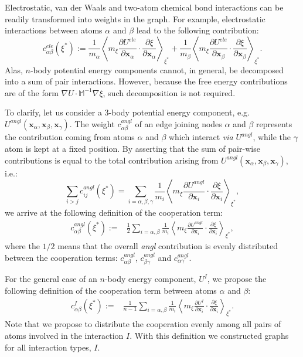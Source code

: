 Electrostatic, van der Waals and two-atom chemical bond interactions can be readily transformed into weights in the graph.
For example, electrostatic interactions between atoms $\alpha$ and $\beta$ lead to the following contribution:
\begin{equation}
c_{\alpha\beta}^{ele}(\xi^*):= \frac{1}{m_\alpha} \left\langle m_\xi \frac{\partial U^{ele}}{\partial \mathbf{x}_\alpha}\cdot\frac{\partial\xi}{\partial\mathbf{x}_\alpha} \right\rangle_{\xi^*}  + \frac{1}{m_\beta} \left\langle m_\xi \frac{\partial U^{ele}}{\partial \mathbf{x}_\beta}\cdot\frac{\partial\xi}{\partial\mathbf{x}_\beta} \right \rangle_{\xi^*} .
\end{equation}
Alas, $n$-body potential energy components cannot, in general, be decomposed into a sum of pair interactions.
However, because the free energy contributions are of the form $\nabla U\cdot\mathbb{M}^{-1}\nabla\xi$, such decomposition is not required.

To clarify, let us consider a 3-body potential energy component, e.g. $U^{angl}(\mathbf{x}_\alpha,\mathbf{x}_\beta,\mathbf{x}_\gamma)$.
The weight $c^{angl}_{\alpha\beta}$ of an edge joining nodes $\alpha$ and $\beta$  represents the contribution coming from atoms $\alpha$ and $\beta$ which interact \emph{via} $U^{angl}$, while the $\gamma$ atom is kept at a fixed position.
By asserting that the sum of pair-wise contributions is equal to the total contribution arising from $U^{angl}(\mathbf{x}_\alpha,\mathbf{x}_\beta,\mathbf{x}_\gamma)$, i.e.:
$$\sum_{i>j}c^{angl}_{ij}(\xi^*)=\sum_{i=\alpha,\beta,\gamma}\frac{1}{m_i} \left\langle m_\xi \frac{\partial U^{angl}}{\partial \mathbf{x}_i}\cdot\frac{\partial\xi}{\partial\mathbf{x}_i} \right\rangle_{\xi^*},$$
we arrive at the following definition of the cooperation term:
\begin{align}
\nonumber c_{\alpha\beta}^{angl}(\xi^*):=&\frac{1}{2}\sum_{i=\alpha,\beta}\frac{1}{m_i} \left\langle m_\xi \frac{\partial U^{angl}}{\partial \mathbf{x}_i}\cdot\frac{\partial\xi}{\partial\mathbf{x}_i} \right\rangle_{\xi^*},
\end{align}
where the $1/2$ means that the overall \emph{angl} contribution is evenly distributed between the cooperation terms: $c_{\alpha\beta}^{angl}$, $c_{\beta\gamma}^{angl}$ and $c_{\alpha\gamma}^{angl}$.

For the general case of an $n$-body energy component, $U^I$, we propose the following definition of the cooperation term between atoms $\alpha$ and $\beta$:
\begin{align}
\nonumber c_{\alpha\beta}^{I}(\xi^*):=&\frac{1}{n-1}\sum_{i=\alpha,\beta}\frac{1}{m_i} \left\langle m_\xi \frac{\partial U^{I}}{\partial \mathbf{x}_i}\cdot\frac{\partial\xi}{\partial\mathbf{x}_i} \right\rangle_{\xi^*}.
\end{align}
Note that we propose to distribute the cooperation evenly among all pairs of atoms involved in the interaction $I$.
With this definition we constructed graphs for all interaction types, $I$.

